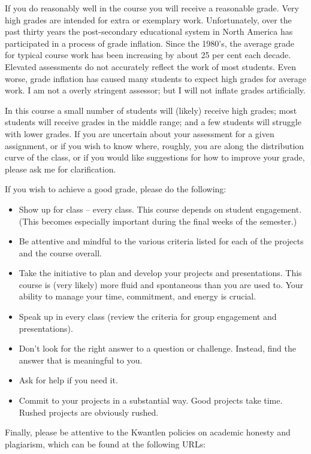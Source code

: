 \documentclass[letterpaper,10pt,headsepline]{scrreprt}
\begin{document}
If you do reasonably well in the course you will receive a reasonable grade. Very high grades are intended for extra or exemplary work.
Unfortunately, over the past thirty years the post-secondary educational system in North America has participated in a process of
grade inflation. Since the 1980's, the average grade for typical course work has been increasing by about 25 per cent each decade.
Elevated assessments do not accurately reflect the work of most students. Even worse, grade inflation has caused many students to
expect high grades for average work. I am not a overly stringent assessor; but I will not inflate grades artificially.

In this course a small number of students will (likely) receive high grades; most students will receive grades in the middle range; and a few students will struggle with lower grades. If you are uncertain about your assessment for a given assignment, or if you wish to know where, roughly, you are along the distribution curve of the class, or if you would like suggestions for how to improve your grade, please ask me for clarification.

If you wish to achieve a good grade, please do the following:

\begin{itemize}
\item Show up for class -- every class. This course depends on student engagement. (This becomes especially important during the final weeks of the semester.)
\item Be attentive and mindful to the various criteria listed for each of the projects and the course overall.
\item Take the initiative to plan and develop your projects and presentations. This course is (very likely) more fluid and spontaneous than you are used to. Your ability to manage your time, commitment, and energy is crucial.
\item Speak up in every class (review the criteria for group engagement and presentations).
\item Don't look for the right answer to a question or challenge. Instead, find the answer that is meaningful to you.
\item Ask for help if you need it.
\item Commit to your projects in a substantial way. Good projects take time. Rushed projects are obviously rushed.
\end{itemize}

Finally, please be attentive to the Kwantlen policies on academic honesty and plagiarism, which can be found at the following URLs:
\end{document}
